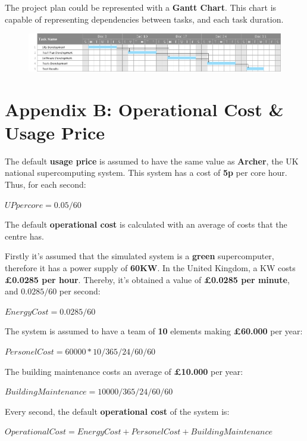 \documentclass{scrreprt}
\begin{document}
The project plan could be represented with a \textbf{Gantt Chart}. This chart is capable of representing dependencies between tasks, and each task duration.
\begin{figure}[!htb]
  \centering
  \includegraphics[width=\linewidth]{ProjectPlan.png}
\end{figure}

\section{Appendix B: Operational Cost \& Usage Price}

\par The default \textbf{usage price} is assumed to have the same value as \textbf{Archer}, the UK national supercomputing system. This system has a cost of \textbf{5p} per core hour. Thus, for each second:

\begin{center}
	$
		UP per core = 0.05 / 60
	$
\end{center}

\par The default \textbf{operational cost} is calculated with an average of costs that the centre has. 
\par Firstly it's assumed that the simulated system is a \textbf{green} supercomputer, therefore it has a power supply of \textbf{60KW}. In the United Kingdom, a KW costs \textbf{£0.0285 per hour}. Thereby, it's obtained a value of \textbf{£0.0285 per minute}, and $0.0285 / 60$ per second:
\begin{center}
	$
		Energy Cost = 0.0285 / 60
	$
\end{center}
The system is assumed to have a team of \textbf{10} elements making \textbf{£60.000} per year:
\begin{center}
	$
		Personel Cost = 60000 * 10 / 365 / 24 / 60 / 60
	$
\end{center}
The building maintenance costs an average of \textbf{£10.000} per year:
\begin{center}
	$
		Building Maintenance = 10000 / 365 / 24 / 60 / 60
	$
\end{center}
Every second, the default \textbf{operational cost} of the system is:
\begin{center}
	$
		Operational Cost = Energy Cost + Personel Cost + Building Maintenance
	$
\end{center}
\end{document}

